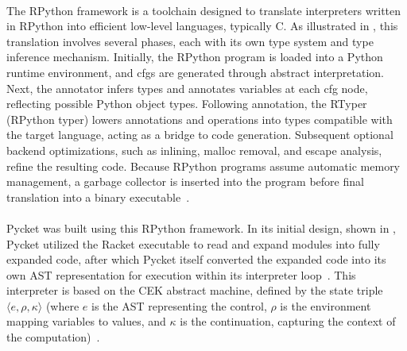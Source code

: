 
        \paragraph{}%
            The RPython framework is a toolchain designed to translate interpreters written in RPython into efficient low-level languages, typically C. As illustrated in , this translation involves several phases, each with its own type system and type inference mechanism. Initially, the RPython program is loaded into a Python runtime environment, and \glspl{cfg} are generated through abstract interpretation. Next, the annotator infers types and annotates variables at each \gls{cfg} node, reflecting possible Python object types. Following annotation, the RTyper (RPython typer) lowers annotations and operations into types compatible with the target language, acting as a bridge to code generation. Subsequent optional backend optimizations, such as inlining, malloc removal, and escape analysis, refine the resulting code. Because RPython programs assume automatic memory management, a garbage collector is inserted into the program before final translation into a binary executable~\cite{rpython07,pypy06,pypy08}.

        \paragraph{}%
            Pycket was built using this RPython framework. In its initial design, shown in , Pycket utilized the Racket executable to read and expand modules into fully expanded code, after which Pycket itself converted the expanded code into its own AST representation for execution within its interpreter loop~\cite{samth:11,bolzMetatracingMakesFast2014,pycketmain}. This interpreter is based on the CEK abstract machine, defined by the state triple $\langle e,\rho,\kappa\rangle$ (where $e$ is the AST representing the control, $\rho$ is the environment mapping variables to values, and $\kappa$ is the continuation, capturing the context of the computation)~\cite{felleisen87}.


